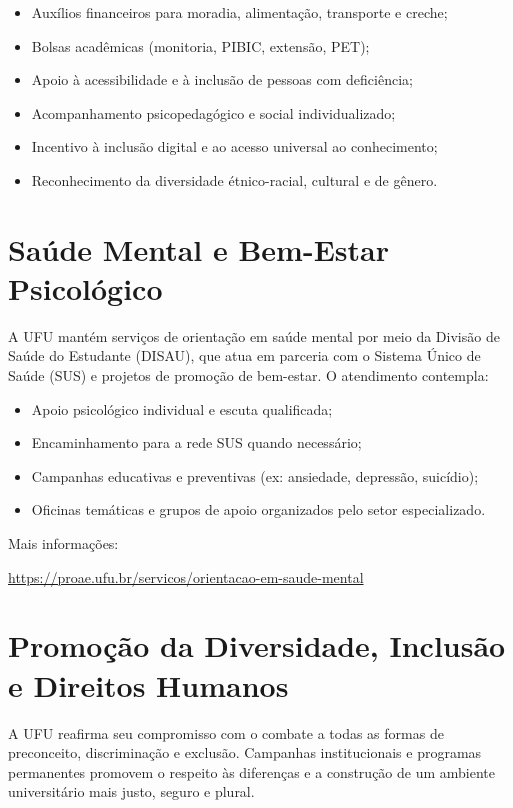 \begin{itemize}
\item Auxílios financeiros para moradia, alimentação, transporte e creche;
\item Bolsas acadêmicas (monitoria, PIBIC, extensão, PET);
\item Apoio à acessibilidade e à inclusão de pessoas com deficiência;
\item Acompanhamento psicopedagógico e social individualizado;
\item Incentivo à inclusão digital e ao acesso universal ao conhecimento;
\item Reconhecimento da diversidade étnico-racial, cultural e de gênero.
\end{itemize}

\section{Saúde Mental e Bem-Estar Psicológico}

A UFU mantém serviços de orientação em saúde mental por meio da Divisão de Saúde do Estudante (DISAU), que atua em parceria com o Sistema Único de Saúde (SUS) e projetos de promoção de bem-estar. O atendimento contempla:

\begin{itemize}
\item Apoio psicológico individual e escuta qualificada;
\item Encaminhamento para a rede SUS quando necessário;
\item Campanhas educativas e preventivas (ex: ansiedade, depressão, suicídio);
\item Oficinas temáticas e grupos de apoio organizados pelo setor especializado.
\end{itemize}

Mais informações:

{\footnotesize\url{https://proae.ufu.br/servicos/orientacao-em-saude-mental}}

\section{Promoção da Diversidade, Inclusão e Direitos Humanos}

A UFU reafirma seu compromisso com o combate a todas as formas de preconceito, discriminação e exclusão. Campanhas institucionais e programas permanentes promovem o respeito às diferenças e a construção de um ambiente universitário mais justo, seguro e plural.

